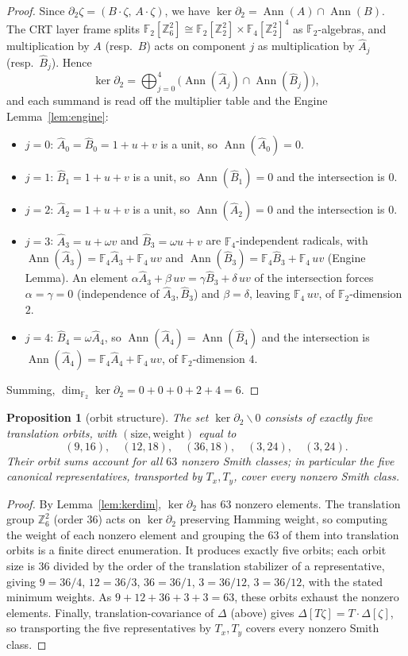 \documentclass[11pt]{article}
\newcommand{\Z}{\mathbb{Z}}
\newcommand{\F}[1]{\mathbb{F}_{#1}}
\DeclareMathOperator{\Ann}{Ann}
\newcommand{\hA}{\hat{A}}
\newcommand{\hB}{\hat{B}}
\newcommand{\cmap}{\Delta}                       %
\theoremstyle{plain}
\newtheorem{proposition}[lemma]{Proposition}
\theoremstyle{definition}
\theoremstyle{remark}
\begin{document}
\begin{proof}
Since $\partial_2\zeta=(B\cdot\zeta,\,A\cdot\zeta)$, we have
$\ker\partial_2=\Ann(A)\cap\Ann(B)$. The CRT layer frame splits
$\F2[\Z_6^2]\cong\F2[\Z_2^2]\times\F4[\Z_2^2]^4$ as $\F2$-algebras, and multiplication by
$A$ (resp.\ $B$) acts on component $j$ as multiplication by $\hA_j$ (resp.\ $\hB_j$). Hence
\[
  \ker\partial_2=\bigoplus_{j=0}^{4}\bigl(\Ann(\hA_j)\cap\Ann(\hB_j)\bigr),
\]
and each summand is read off the multiplier table and the Engine Lemma~\ref{lem:engine}:
\begin{itemize}[nosep]
\item $j=0$: $\hA_0=\hB_0=1+u+v$ is a unit, so $\Ann(\hA_0)=0$.
\item $j=1$: $\hB_1=1+u+v$ is a unit, so $\Ann(\hB_1)=0$ and the intersection is $0$.
\item $j=2$: $\hA_2=1+u+v$ is a unit, so $\Ann(\hA_2)=0$ and the intersection is $0$.
\item $j=3$: $\hA_3=u+\omega v$ and $\hB_3=\omega u+v$ are $\F4$-independent radicals, with
  $\Ann(\hA_3)=\F4\hA_3+\F4\,uv$ and $\Ann(\hB_3)=\F4\hB_3+\F4\,uv$ (Engine Lemma). An element
  $\alpha\hA_3+\beta\,uv=\gamma\hB_3+\delta\,uv$ of the intersection forces $\alpha=\gamma=0$
  (independence of $\hA_3,\hB_3$) and $\beta=\delta$, leaving $\F4\,uv$, of $\F2$-dimension $2$.
\item $j=4$: $\hB_4=\omega\hA_4$, so $\Ann(\hA_4)=\Ann(\hB_4)$ and the intersection is
  $\Ann(\hA_4)=\F4\hA_4+\F4\,uv$, of $\F2$-dimension $4$.
\end{itemize}
Summing, $\dim_{\F2}\ker\partial_2=0+0+0+2+4=6$.
\end{proof}

\begin{proposition}[orbit structure]\label{prop:smithorbits}
The set $\ker\partial_2\smallsetminus 0$ consists of exactly five translation
orbits, with $(\text{size},\text{weight})$ equal to
\[
  (9,16),\quad (12,18),\quad (36,18),\quad (3,24),\quad (3,24).
\]
Their orbit sums account for all $63$ nonzero Smith classes; in particular the
five canonical representatives, transported by $T_x,T_y$, cover every nonzero
Smith class.
\end{proposition}

\begin{proof}
By Lemma~\ref{lem:kerdim}, $\ker\partial_2$ has $63$ nonzero elements. The translation group
$\Z_6^2$ (order $36$) acts on $\ker\partial_2$ preserving Hamming weight, so computing the
weight of each nonzero element and grouping the $63$ of them into translation orbits is a
finite direct enumeration. It produces exactly five orbits; each orbit size is $36$ divided by
the order of the translation stabilizer of a representative, giving
$9=36/4$, $12=36/3$, $36=36/1$, $3=36/12$, $3=36/12$, with the stated minimum weights. As
$9+12+36+3+3=63$, these orbits exhaust the nonzero elements. Finally, translation-covariance of
$\cmap$ (above) gives $\cmap[T\zeta]=T\cdot\cmap[\zeta]$, so transporting the five
representatives by $T_x,T_y$ covers every nonzero Smith class.
\end{proof}
\end{document}
